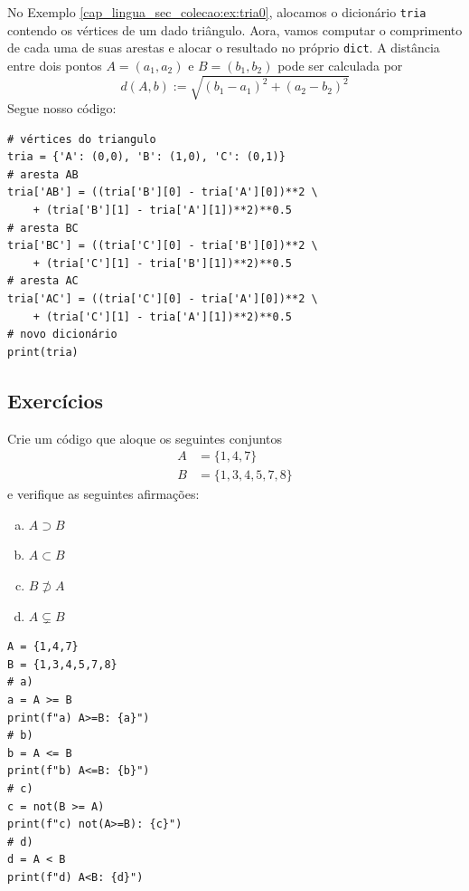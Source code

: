 \begin{ex}
  No Exemplo \ref{cap_lingua_sec_colecao:ex:tria0}, alocamos o dicionário \lstinline+tria+ contendo os vértices de um dado triângulo. Aora, vamos computar o comprimento de cada uma de suas arestas e alocar o resultado no próprio \lstinline+dict+. A distância entre dois pontos $A = (a_1, a_2)$ e $B = (b_1, b_2)$ pode ser calculada por
  \begin{equation}
    d(A, b) := \sqrt{(b_1-a_1)^2 + (a_2-b_2)^2}
  \end{equation}
  Segue nosso código:
\begin{lstlisting}
# vértices do triangulo
tria = {'A': (0,0), 'B': (1,0), 'C': (0,1)}
# aresta AB
tria['AB'] = ((tria['B'][0] - tria['A'][0])**2 \
    + (tria['B'][1] - tria['A'][1])**2)**0.5
# aresta BC
tria['BC'] = ((tria['C'][0] - tria['B'][0])**2 \
    + (tria['C'][1] - tria['B'][1])**2)**0.5
# aresta AC
tria['AC'] = ((tria['C'][0] - tria['A'][0])**2 \
    + (tria['C'][1] - tria['A'][1])**2)**0.5
# novo dicionário
print(tria)
\end{lstlisting}
\end{ex}

\subsection{Exercícios}

\begin{exer}
  Crie um código que aloque os seguintes conjuntos
  \begin{align}
    A &= \{1,4,7\}\\
    B &= \{1,3,4,5,7,8\}
  \end{align}
  e verifique as seguintes afirmações:
  \begin{enumerate}[a)]
  \item $A\supset B$
  \item $A\subset B$
  \item $B\not\supset A$
  \item $A\subsetneq B$
  \end{enumerate}
\end{exer}
\begin{resp}
\begin{lstlisting}
A = {1,4,7}
B = {1,3,4,5,7,8}
# a)
a = A >= B
print(f"a) A>=B: {a}")
# b)
b = A <= B
print(f"b) A<=B: {b}")
# c)
c = not(B >= A)
print(f"c) not(A>=B): {c}")
# d)
d = A < B
print(f"d) A<B: {d}")
\end{lstlisting}
\end{resp}

